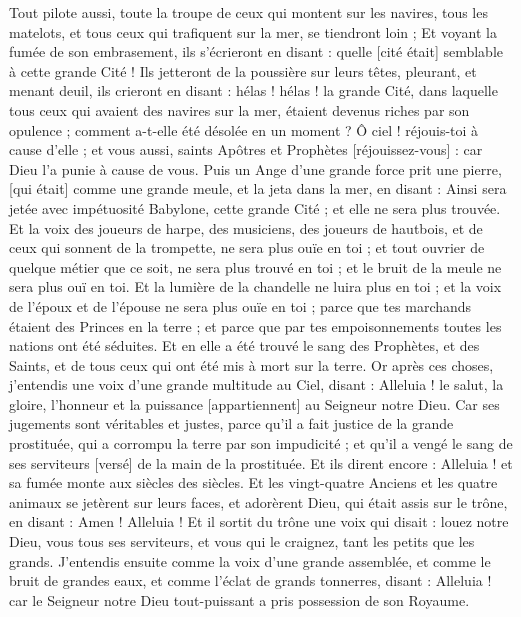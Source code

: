 \begin{multicols}{2}
Tout pilote aussi, toute la troupe de ceux qui montent sur les navires, tous les matelots, et tous ceux qui trafiquent sur la mer, se tiendront loin ;
Et voyant la fumée de son embrasement, ils s'écrieront en disant : quelle [cité était] semblable à cette grande Cité !
Ils jetteront de la poussière sur leurs têtes, pleurant, et menant deuil, ils crieront en disant : hélas ! hélas ! la grande Cité, dans laquelle tous ceux qui avaient des navires sur la mer, étaient devenus riches par son opulence ; comment a-t-elle été désolée en un moment ?
Ô ciel ! réjouis-toi à cause d'elle ; et vous aussi, saints Apôtres et Prophètes [réjouissez-vous] : car Dieu l'a punie à cause de vous.
Puis un Ange d'une grande force prit une pierre, [qui était] comme une grande meule, et la jeta dans la mer, en disant : Ainsi sera jetée avec impétuosité Babylone, cette grande Cité ; et elle ne sera plus trouvée.
Et la voix des joueurs de harpe, des musiciens, des joueurs de hautbois, et de ceux qui sonnent de la trompette, ne sera plus ouïe en toi ; et tout ouvrier de quelque métier que ce soit, ne sera plus trouvé en toi ; et le bruit de la meule ne sera plus ouï en toi.
Et la lumière de la chandelle ne luira plus en toi ; et la voix de l'époux et de l'épouse ne sera plus ouïe en toi ; parce que tes marchands étaient des Princes en la terre ; et parce que par tes empoisonnements toutes les nations ont été séduites.
Et en elle a été trouvé le sang des Prophètes, et des Saints, et de tous ceux qui ont été mis à mort sur la terre.
\VerseOne{}Or après ces choses, j'entendis une voix d'une grande multitude au Ciel, disant : Alleluia ! le salut, la gloire, l'honneur et la puissance [appartiennent] au Seigneur notre Dieu.
Car ses jugements sont véritables et justes, parce qu'il a fait justice de la grande prostituée, qui a corrompu la terre par son impudicité ; et qu'il a vengé le sang de ses serviteurs [versé] de la main de la prostituée.
Et ils dirent encore : Alleluia ! et sa fumée monte aux siècles des siècles.
Et les vingt-quatre Anciens et les quatre animaux se jetèrent sur leurs faces, et adorèrent Dieu, qui était assis sur le trône, en disant : Amen ! Alleluia !
Et il sortit du trône une voix qui disait : louez notre Dieu, vous tous ses serviteurs, et vous qui le craignez, tant les petits que les grands.
J'entendis ensuite comme la voix d'une grande assemblée, et comme le bruit de grandes eaux, et comme l'éclat de grands tonnerres, disant : Alleluia ! car le Seigneur notre Dieu tout-puissant a pris possession de son Royaume.

\end{multicols}
